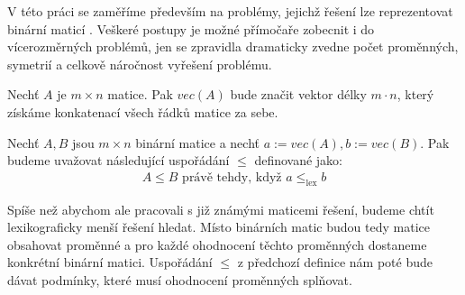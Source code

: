 V této práci se zaměříme především na problémy, jejichž řešení lze reprezentovat binární maticí \cite{inproceedings}. Veškeré postupy je možné přímočaře zobecnit i do vícerozměrných problémů, jen se zpravidla dramaticky zvedne počet proměnných, symetrií a celkově náročnost vyřešení problému. 




\begin{definice}
Nechť $A$ je $m \times n$ matice. Pak $vec(A)$ bude značit vektor délky $m \cdot n$, který získáme konkatenací všech řádků matice za sebe.
\end{definice}

\begin{definice}
Nechť $A, B$ jsou $m \times n$ binární matice a nechť $a := vec(A), b := vec(B)$. Pak budeme uvažovat následující uspořádání $\leq$ definované jako:
\begin{align*}
A \leq B \text{ právě tehdy, když } a \leq_{\text{lex}} b
\end{align*}
\end{definice}

Spíše než abychom ale pracovali s již známými maticemi řešení, budeme chtít lexikograficky menší řešení hledat. Místo binárních matic budou tedy matice obsahovat proměnné a pro každé ohodnocení těchto proměnných dostaneme konkrétní binární matici. Uspořádání $\leq$ z předchozí definice nám poté bude dávat podmínky, které musí ohodnocení proměnných splňovat. 

